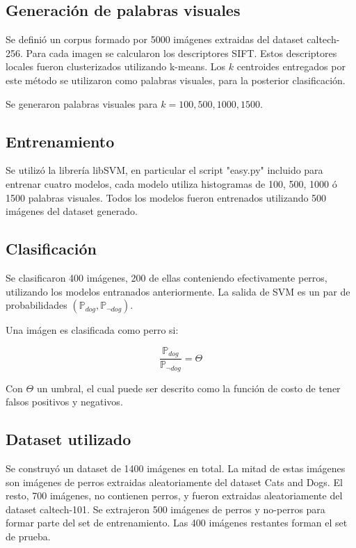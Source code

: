 \documentclass[12pt]{article}
\begin{document}
\subsection{Generación de palabras visuales}

Se definió un corpus formado por 5000 imágenes extraidas del dataset caltech-256\cite{griffin2007caltech}. Para cada imagen se calcularon los descriptores SIFT.
Estos descriptores locales fueron clusterizados utilizando k-means. Los $k$ centroides entregados por este método se utilizaron como
palabras visuales, para la posterior clasificación.

Se generaron palabras visuales para $k = 100, 500, 1000, 1500$.

\subsection{Entrenamiento}

Se utilizó la librería libSVM, en particular el script "easy.py" incluido para entrenar cuatro modelos, cada modelo utiliza histogramas de 100, 500, 1000 ó 1500
palabras visuales. Todos los modelos fueron entrenados utilizando 500 imágenes del dataset generado.

\subsection{Clasificación}

Se clasificaron 400 imágenes, 200 de ellas conteniendo efectivamente perros, utilizando los modelos entranados anteriormente. La salida de SVM es un par de probabilidades 
$(\mathbb{P}_{dog},\mathbb{P}_{\neg dog})$.

Una imágen es clasificada como perro si:

\begin{equation}
    \frac{ \mathbb{P}_{dog} }{ \mathbb{P}_{\neg dog} } =
    \Theta
\end{equation}

Con $\Theta$ un umbral, el cual puede ser descrito como la función de costo de tener falsos positivos y negativos.

\subsection{Dataset utilizado}
Se construyó un dataset de 1400 imágenes en total. La mitad de estas imágenes son imágenes de perros extraidas aleatoriamente del dataset Cats and Dogs\cite{parkhi12a}. 
El resto, 700 imágenes, no contienen perros, y fueron extraidas aleatoriamente del dataset caltech-101\cite{caltech101}.
Se extrajeron 500 imágenes de perros y no-perros para formar parte del set de entrenamiento.
Las 400 imágenes restantes forman el set de prueba.
\end{document}
